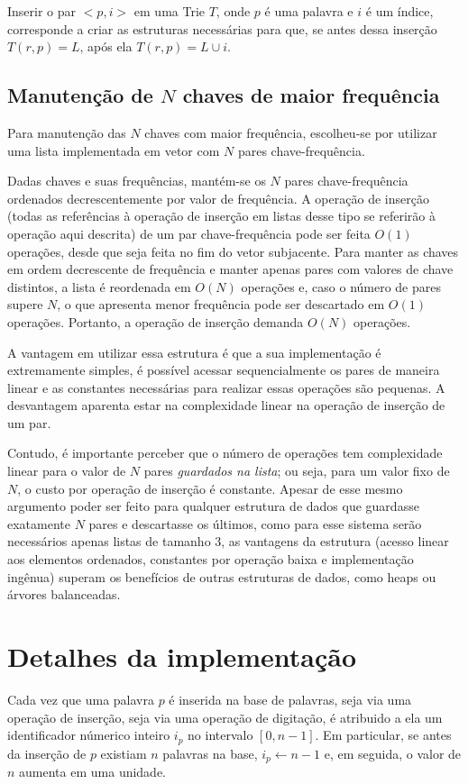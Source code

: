 \documentclass[12pt]{article}
\begin{document}
    Inserir o par $<p, i>$ em uma Trie $T$, onde $p$ é uma palavra e $i$ é um índice, corresponde a criar as estruturas necessárias para que, se antes dessa inserção $T(r, p) = L$, após ela $T(r, p) = L \cup i$.

    \subsection{Manutenção de $N$ chaves de maior frequência} \label{sec:list}
    Para manutenção das $N$ chaves com maior frequência, escolheu-se por utilizar uma lista implementada em vetor com $N$ pares chave-frequência.

    Dadas chaves e suas fre\-quên\-cias, mantém-se os $N$ pares chave-frequência ordenados decrescentemente por valor de frequência.
    A operação de inserção (todas as referências à operação de inserção em listas desse tipo se referirão à operação aqui descrita) de um par chave-frequência pode ser feita $O(1)$ operações, desde que seja feita no fim do vetor subjacente.
    Para manter as chaves em ordem decrescente de frequência e manter apenas pares com valores de chave distintos, a lista é reordenada em $O(N)$ operações e, caso o número de pares supere $N$, o que apresenta menor frequência pode ser descartado em $O(1)$ operações.
    Portanto, a operação de inserção demanda $O(N)$ operações.

    A vantagem em utilizar essa estrutura é que a sua implementação é extremamente simples, é possível acessar sequencialmente os pares de maneira linear e as constantes necessárias para realizar essas operações são pequenas.
    A desvantagem aparenta estar na complexidade linear na operação de inserção de um par.

    Contudo, é importante perceber que o número de operações tem complexidade linear para o valor de $N$ pares \emph{guardados na lista}; ou seja, para um valor fixo de $N$, o custo por operação de inserção é constante.
    Apesar de esse mesmo argumento poder ser feito para qualquer estrutura de dados que guardasse exatamente $N$ pares e descartasse os últimos, como para esse sistema serão necessários apenas listas de tamanho 3, as vantagens da estrutura (acesso linear aos elementos ordenados, constantes por operação baixa e implementação ingênua) superam os benefícios de outras estruturas de dados, como heaps ou árvores balanceadas.

  \section{Detalhes da implementação}
    Cada vez que uma palavra $p$ é inserida na base de palavras, seja via uma operação de inserção, seja via uma operação de digitação, é atribuido a ela um identificador númerico inteiro $i_p$ no intervalo $[0, n - 1]$.
    Em particular, se antes da inserção de $p$ existiam $n$ palavras na base, $i_p \leftarrow n - 1$ e, em seguida, o valor de $n$ aumenta em uma unidade.
\end{document}
